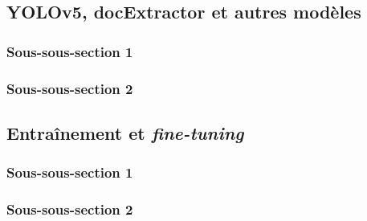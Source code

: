 
\subsection{YOLOv5, docExtractor et autres modèles}
    \subsubsection{Sous-sous-section 1}

    
    \subsubsection{Sous-sous-section 2}

    
    \subsection{Entraînement et \textit{fine-tuning}}
        \subsubsection{Sous-sous-section 1}


        \subsubsection{Sous-sous-section 2}

